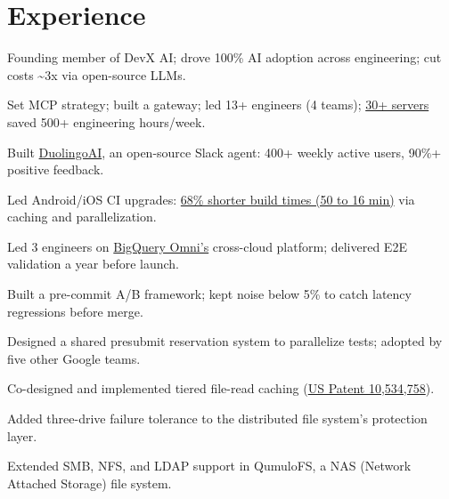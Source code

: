 \documentclass[]{plushcv}
\begin{document}

\section{Experience}

\begin{tightemize}
\item Founding member of DevX AI; drove 100\% AI adoption across engineering; cut costs \textasciitilde{}3x via open-source LLMs.
\item Set MCP strategy; built a gateway; led 13+ engineers (4 teams); \href{https://github.com/duolingo/slack-mcp}{30+ servers} saved 500+ engineering hours/week.
\item Built \href{https://github.com/duolingo/slack-ai-agent}{DuolingoAI}, an open-source Slack agent: 400+ weekly active users, 90\%+ positive feedback.
\item Led Android/iOS CI upgrades: \href{https://blog.duolingo.com/sped-up-android-ios-builds/}{68\% shorter build times (50 to 16 min)} via caching and parallelization.
\end{tightemize}
\vspace{9pt}

\begin{tightemize}
\item Led 3 engineers on \href{https://cloud.google.com/blog/products/data-analytics/introducing-bigquery-omni}{BigQuery Omni's} cross-cloud platform; delivered E2E validation a year before launch.
\item Built a pre-commit A/B framework; kept noise below 5\% to catch latency regressions before merge.
\item Designed a shared presubmit reservation system to parallelize tests; adopted by five other Google teams.
\end{tightemize}
\vspace{9pt}

\begin{tightemize}
\item Co-designed and implemented tiered file-read caching (\href{https://patents.justia.com/patent/10534758}{US Patent 10,534,758}).
\item Added three-drive failure tolerance to the distributed file system's protection layer.
\item Extended SMB, NFS, and LDAP support in QumuloFS, a NAS (Network Attached Storage) file system.
\end{tightemize}
\sectionsep
\end{document}
